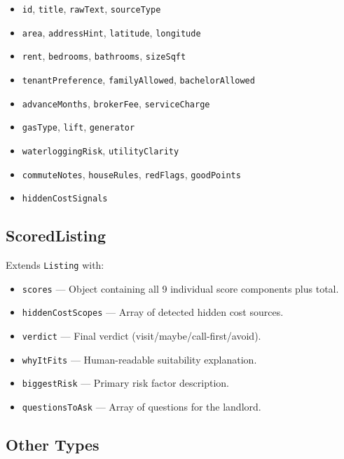 \documentclass[12pt, a4paper, oneside]{report}
\newcommand{\typename}[1]{\texttt{\small\color{codeblue}#1}}
\begin{document}
\begin{itemize}[leftmargin=2em]
  \item \texttt{id}, \texttt{title}, \texttt{rawText}, \texttt{sourceType}
  \item \texttt{area}, \texttt{addressHint}, \texttt{latitude}, \texttt{longitude}
  \item \texttt{rent}, \texttt{bedrooms}, \texttt{bathrooms}, \texttt{sizeSqft}
  \item \texttt{tenantPreference}, \texttt{familyAllowed}, \texttt{bachelorAllowed}
  \item \texttt{advanceMonths}, \texttt{brokerFee}, \texttt{serviceCharge}
  \item \texttt{gasType}, \texttt{lift}, \texttt{generator}
  \item \texttt{waterloggingRisk}, \texttt{utilityClarity}
  \item \texttt{commuteNotes}, \texttt{houseRules}, \texttt{redFlags}, \texttt{goodPoints}
  \item \texttt{hiddenCostSignals}
\end{itemize}

\subsection{ScoredListing}

Extends \typename{Listing} with:

\begin{itemize}[leftmargin=2em]
  \item \texttt{scores} --- Object containing all 9 individual score components plus total.
  \item \texttt{hiddenCostScopes} --- Array of detected hidden cost sources.
  \item \texttt{verdict} --- Final verdict (visit/maybe/call-first/avoid).
  \item \texttt{whyItFits} --- Human-readable suitability explanation.
  \item \texttt{biggestRisk} --- Primary risk factor description.
  \item \texttt{questionsToAsk} --- Array of questions for the landlord.
\end{itemize}

\subsection{Other Types}
\end{document}
